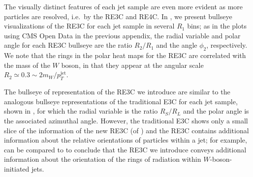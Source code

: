 The visually distinct features of each jet sample are even more evident as more particles are resolved, i.e.~by the RE3C and RE4C.
%
In , we present bullseye visualizations of the RE3C for each jet sample in several \(R_1\) bins;
%
as in the plots using CMS Open Data in the previous appendix, the radial variable and polar angle for each RE3C bullseye are the ratio \(R_2/R_1\) and the angle \(\phi_2\), respectively.
%
We note that the rings in the polar heat maps for the RE3C are correlated with the mass of the \(W\) boson, in that they appear at the angular scale \(R_2 \simeq 0.3 \sim 2 m_W / p_T^\text{jet}\).

The bullseye of representation of the RE3C we introduce are similar to the analogous bullseye representations of the traditional E3C for each jet sample, shown in , for which the radial variable is the ratio \(R_S/R_L\) and the polar angle is the associated azimuthal angle.
%
However, the traditional E3C shows only a small slice of the information of the new RE3C (of ) and the RE3C contains additional information about the relative orientations of particles within a jet;
%
for example,  can be compared to  to conclude that the RE3C we introduce conveys additional information about the orientation of the rings of radiation within \(W\)-boson-initiated jets.

